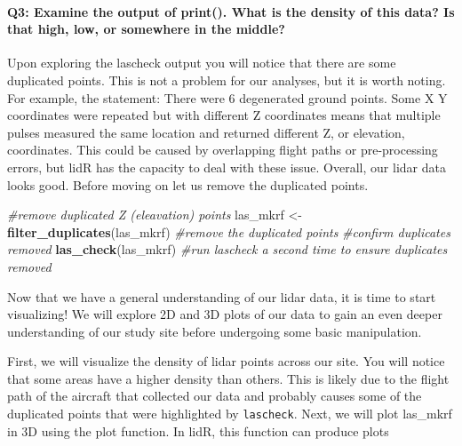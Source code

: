 \documentclass[
]{book}
\newenvironment{Shaded}{\begin{snugshade}}{\end{snugshade}}
\newcommand{\CommentTok}[1]{\textcolor[rgb]{0.56,0.35,0.01}{\textit{#1}}}
\newcommand{\FunctionTok}[1]{\textcolor[rgb]{0.13,0.29,0.53}{\textbf{#1}}}
\newcommand{\NormalTok}[1]{#1}
\newcommand{\OtherTok}[1]{\textcolor[rgb]{0.56,0.35,0.01}{#1}}
\begin{document}
\hypertarget{q3-examine-the-output-of-print.-what-is-the-density-of-this-data-is-that-high-low-or-somewhere-in-the-middle}{%
\paragraph*{Q3: Examine the output of print(). What is the density of this data? Is that high, low, or somewhere in the middle?}\label{q3-examine-the-output-of-print.-what-is-the-density-of-this-data-is-that-high-low-or-somewhere-in-the-middle}}

Upon exploring the lascheck output you will notice that there are some duplicated points. This is not a problem for our analyses, but it is worth noting. For example, the statement: There were 6 degenerated ground points. Some X Y coordinates were repeated but with different Z coordinates means that multiple pulses measured the same location and returned different Z, or elevation, coordinates. This could be caused by overlapping flight paths or pre-processing errors, but lidR has the capacity to deal with these issue. Overall, our lidar data looks good. Before moving on let us remove the duplicated points.

\begin{Shaded}
\begin{Highlighting}[]
\CommentTok{\#remove duplicated Z (eleavation) points}
\NormalTok{las\_mkrf }\OtherTok{\textless{}{-}} \FunctionTok{filter\_duplicates}\NormalTok{(las\_mkrf) }\CommentTok{\#remove the duplicated points}
\CommentTok{\#confirm duplicates removed}
\FunctionTok{las\_check}\NormalTok{(las\_mkrf) }\CommentTok{\#run lascheck a second time to ensure duplicates removed}
\end{Highlighting}
\end{Shaded}

Now that we have a general understanding of our lidar data, it is time to start visualizing! We will explore 2D and 3D plots of our data to gain an even deeper understanding of our study site before undergoing some basic manipulation.

First, we will visualize the density of lidar points across our site. You will notice that some areas have a higher density than others. This is likely due to the flight path of the aircraft that collected our data and probably causes some of the duplicated points that were highlighted by \texttt{lascheck}. Next, we will plot las\_mkrf in 3D using the plot function. In lidR, this function can produce plots
\end{document}
